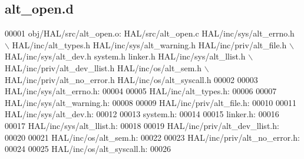 \subsection{alt\+\_\+open.\+d}
\label{alt__open_8d_source}

\begin{DoxyCode}
00001 obj/HAL/src/alt\_open.o: HAL/src/alt\_open.c HAL/inc/sys/alt_errno.h \(\backslash\)
 HAL/inc/alt\_types.h HAL/inc/sys/alt\_warning.h HAL/inc/priv/alt\_file.h \(\backslash\)
 HAL/inc/sys/alt_dev.h system.h linker.h HAL/inc/sys/alt_llist.h \(\backslash\)
 HAL/inc/priv/alt_dev_llist.h HAL/inc/os/alt\_sem.h \(\backslash\)
 HAL/inc/priv/alt_no_error.h HAL/inc/os/alt\_syscall.h
00002 
00003 HAL/inc/sys/alt_errno.h:
00004 
00005 HAL/inc/alt\_types.h:
00006 
00007 HAL/inc/sys/alt\_warning.h:
00008 
00009 HAL/inc/priv/alt\_file.h:
00010 
00011 HAL/inc/sys/alt_dev.h:
00012 
00013 system.h:
00014 
00015 linker.h:
00016 
00017 HAL/inc/sys/alt_llist.h:
00018 
00019 HAL/inc/priv/alt_dev_llist.h:
00020 
00021 HAL/inc/os/alt\_sem.h:
00022 
00023 HAL/inc/priv/alt_no_error.h:
00024 
00025 HAL/inc/os/alt\_syscall.h:
00026 \end{DoxyCode}

